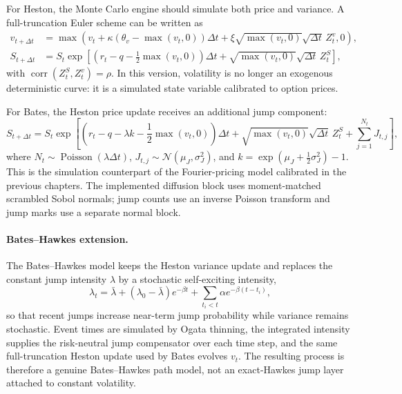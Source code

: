 \documentclass[a4paper,10pt,titlepage,oneside,openany]{book}
\theoremstyle{plain}
\theoremstyle{definition}
\theoremstyle{remark}
\begin{document}
For Heston, the Monte Carlo engine should simulate both price and variance. A full-truncation Euler scheme can be written as
\begin{align}
    v_{t+\Delta t}
    &=
    \max\left(
        v_t + \kappa(\theta_v-\max(v_t,0))\Delta t
        + \xi\sqrt{\max(v_t,0)}\sqrt{\Delta t}\,Z_t^v,
        0
    \right),\\
    S_{t+\Delta t}
    &=
    S_t
    \exp\left[
        \left(r_t-q-\frac{1}{2}\max(v_t,0)\right)\Delta t
        + \sqrt{\max(v_t,0)}\sqrt{\Delta t}\,Z_t^S
    \right],
\end{align}
with \(\operatorname{corr}(Z_t^S,Z_t^v)=\rho\). In this version, volatility is no longer an exogenous deterministic curve: it is a simulated state variable calibrated to option prices.

For Bates, the Heston price update receives an additional jump component:
\begin{equation}
    S_{t+\Delta t}
    =
    S_t
    \exp\left[
        \left(r_t-q-\lambda k-\frac{1}{2}\max(v_t,0)\right)\Delta t
        + \sqrt{\max(v_t,0)}\sqrt{\Delta t}\,Z_t^S
        + \sum_{j=1}^{N_t} J_{t,j}
    \right],
    \label{eq:bates-path}
\end{equation}
where \(N_t\sim\operatorname{Poisson}(\lambda\Delta t)\), \(J_{t,j}\sim\mathcal{N}(\mu_J,\sigma_J^2)\), and \(k=\exp(\mu_J+\frac{1}{2}\sigma_J^2)-1\). This is the simulation counterpart of the Fourier-pricing model calibrated in the previous chapters. The implemented diffusion block uses moment-matched scrambled Sobol normals; jump counts use an inverse Poisson transform and jump marks use a separate normal block.

\paragraph{Bates--Hawkes extension.}
The Bates--Hawkes model keeps the Heston variance update and replaces the constant jump intensity \(\lambda\) by a stochastic self-exciting intensity,
\[
    \lambda_t = \bar{\lambda}+(\lambda_0-\bar{\lambda})e^{-\beta t}+\sum_{t_i<t}\alpha e^{-\beta(t-t_i)},
\]
so that recent jumps increase near-term jump probability while variance remains stochastic. Event times are simulated by Ogata thinning, the integrated intensity supplies the risk-neutral jump compensator over each time step, and the same full-truncation Heston update used by Bates evolves \(v_t\). The resulting process is therefore a genuine Bates--Hawkes path model, not an exact-Hawkes jump layer attached to constant volatility.
\end{document}
